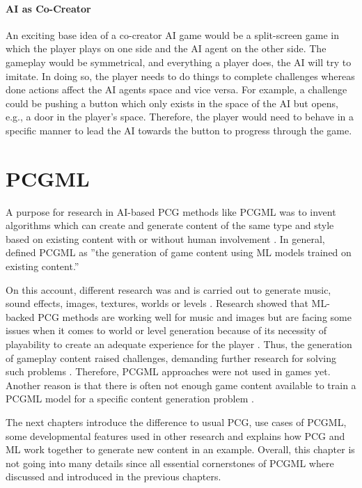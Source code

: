 \documentclass[MGS,Master,english]{twbook}%
\begin{document}
\subsubsection{\acl{AI} as Co-Creator}
An exciting base idea of a co-creator \ac{AI} game would be a split-screen game in which the player plays on one side and the \ac{AI} agent on the other side. The gameplay would be symmetrical, and everything a player does, the \ac{AI} will try to imitate. In doing so, the player needs to do things to complete challenges whereas done actions affect the \ac{AI} agents space and vice versa. For example, a challenge could be pushing a button which only exists in the space of the \ac{AI} but opens, e.g., a door in the player's space. Therefore, the player would need to behave in a specific manner to lead the \ac{AI} towards the button to progress through the game.

%
%
\clearpage
\chapter{\acl{PCGML}}
A purpose for research in \ac{AI}-based \ac{PCG} methods like \ac{PCGML} was to invent algorithms which can create and generate content of the same type and style based on existing content with or without human involvement \cite{ai::book} \cite{pcgml::paper}. In general, \citep{pcgml::paper} defined \ac{PCGML} as ''the generation of game content using \ac{ML} models trained on existing content.'' 

On this account, different research was and is carried out to generate music, sound effects, images, textures, worlds or levels \cite{ai::book}. Research showed that \ac{ML}-backed \ac{PCG} methods are working well for music and images but are facing some issues when it comes to world or level generation because of its necessity of playability to create an adequate experience for the player \cite{ai::book}. Thus, the generation of gameplay content raised challenges, demanding further research for solving such problems \cite{ai::book}. Therefore, \ac{PCGML} approaches were not used in games yet. Another reason is that there is often not enough game content available to train a \ac{PCGML} model for a specific content generation problem \cite{ai::book}. 

The next chapters introduce the difference to usual \ac{PCG}, use cases of \ac{PCGML}, some developmental features used in other research and explains how \ac{PCG} and \ac{ML} work together to generate new content in an example. Overall, this chapter is not going into many details since all essential cornerstones of \ac{PCGML} where discussed and introduced in the previous chapters.
\end{document}
